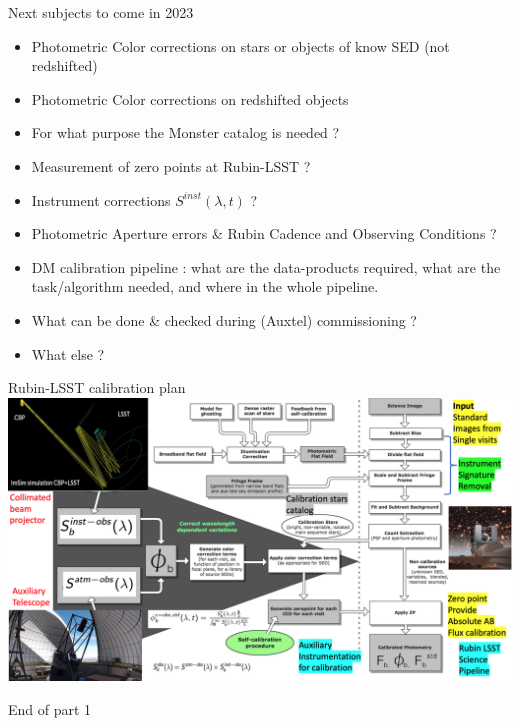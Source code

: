\documentclass{beamer}
\begin{document}
\begin{frame}{Next subjects to come in 2023}
\begin{itemize}
\item Photometric Color corrections on stars or objects of know SED (not redshifted)
\item Photometric Color corrections on redshifted objects
\item For what purpose the Monster catalog is needed ?
\item Measurement of zero points at Rubin-LSST ?
\item Instrument corrections $S^{inst}(\lambda,t)$ ?
\item Photometric Aperture errors \& Rubin Cadence and Observing Conditions ?
\item DM calibration pipeline : what are the data-products required, what are the task/algorithm needed, and where in the whole pipeline. 
\item What can be done \& checked during (Auxtel) commissioning ?
\item What else ?
\end{itemize}
\end{frame}


\begin{frame}{Rubin-LSST calibration plan}
\includegraphics[width=0.95\paperwidth]{figs/calib/LSSTCalibrationPlan_v2.png}
\end{frame}




\begin{frame}
\begin{center}
{

\LARGE \alert{End of part 1}}

\end{center}

\end{frame}










 
\end{document}
